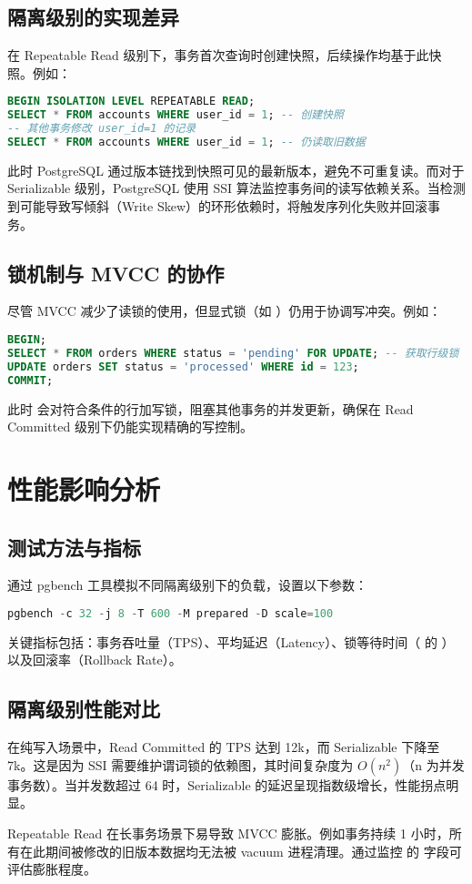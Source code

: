 \section{隔离级别的实现差异}
在 Repeatable Read 级别下，事务首次查询时创建快照，后续操作均基于此快照。例如：\par
\begin{lstlisting}[language=sql]
BEGIN ISOLATION LEVEL REPEATABLE READ;
SELECT * FROM accounts WHERE user_id = 1; -- 创建快照
-- 其他事务修改 user_id=1 的记录
SELECT * FROM accounts WHERE user_id = 1; -- 仍读取旧数据
\end{lstlisting}
此时 PostgreSQL 通过版本链找到快照可见的最新版本，避免不可重复读。而对于 Serializable 级别，PostgreSQL 使用 SSI 算法监控事务间的读写依赖关系。当检测到可能导致写倾斜（Write Skew）的环形依赖时，将触发序列化失败并回滚事务。\par
\section{锁机制与 MVCC 的协作}
尽管 MVCC 减少了读锁的使用，但显式锁（如 ）仍用于协调写冲突。例如：\par
\begin{lstlisting}[language=sql]
BEGIN;
SELECT * FROM orders WHERE status = 'pending' FOR UPDATE; -- 获取行级锁
UPDATE orders SET status = 'processed' WHERE id = 123;
COMMIT;
\end{lstlisting}
此时  会对符合条件的行加写锁，阻塞其他事务的并发更新，确保在 Read Committed 级别下仍能实现精确的写控制。\par
\chapter{性能影响分析}
\section{测试方法与指标}
通过 pgbench 工具模拟不同隔离级别下的负载，设置以下参数：\par
\begin{lstlisting}[language=sql]
pgbench -c 32 -j 8 -T 600 -M prepared -D scale=100
\end{lstlisting}
关键指标包括：事务吞吐量（TPS）、平均延迟（Latency）、锁等待时间（ 的 ）以及回滚率（Rollback Rate）。\par
\section{隔离级别性能对比}
在纯写入场景中，Read Committed 的 TPS 达到 12k，而 Serializable 下降至 7k。这是因为 SSI 需要维护谓词锁的依赖图，其时间复杂度为 $O(n^2)$（n 为并发事务数）。当并发数超过 64 时，Serializable 的延迟呈现指数级增长，性能拐点明显。\par
Repeatable Read 在长事务场景下易导致 MVCC 膨胀。例如事务持续 1 小时，所有在此期间被修改的旧版本数据均无法被 vacuum 进程清理。通过监控  的  字段可评估膨胀程度。\par
